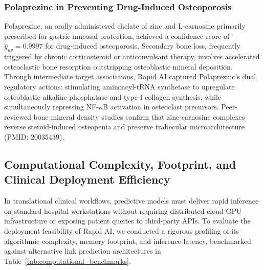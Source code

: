 \documentclass[preprint,12pt]{elsarticle}
\begin{document}
\subsubsection{Polaprezinc in Preventing Drug-Induced Osteoporosis}
Polaprezinc, an orally administered chelate of zinc and L-carnosine primarily prescribed for gastric mucosal protection, achieved a confidence score of $\hat{y}_{uv} = 0.9997$ for drug-induced osteoporosis. Secondary bone loss, frequently triggered by chronic corticosteroid or anticonvulsant therapy, involves accelerated osteoclastic bone resorption outstripping osteoblastic mineral deposition. Through intermediate target associations, Rapid AI captured Polaprezinc's dual regulatory actions: stimulating aminoacyl-tRNA synthetase to upregulate osteoblastic alkaline phosphatase and type-I collagen synthesis, while simultaneously repressing NF-$\kappa$B activation in osteoclast precursors. Peer-reviewed bone mineral density studies confirm that zinc-carnosine complexes reverse steroid-induced osteopenia and preserve trabecular microarchitecture~\cite{ref_polaprezinc} (PMID: 20035439).

\subsection{Computational Complexity, Footprint, and Clinical Deployment Efficiency}
In translational clinical workflows, predictive models must deliver rapid inference on standard hospital workstations without requiring distributed cloud GPU infrastructure or exposing patient queries to third-party APIs. To evaluate the deployment feasibility of Rapid AI, we conducted a rigorous profiling of its algorithmic complexity, memory footprint, and inference latency, benchmarked against alternative link prediction architectures in Table~\ref{tab:computational_benchmarks}.
\end{document}
